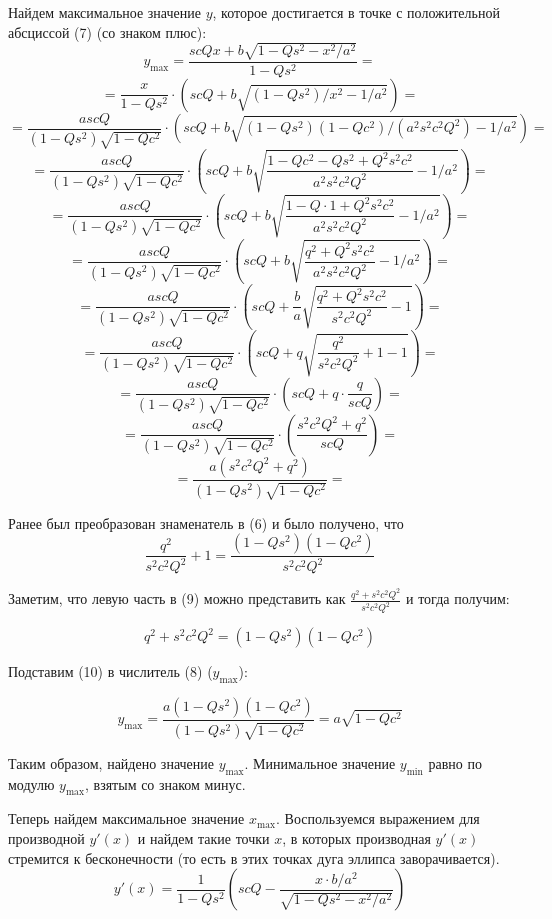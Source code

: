 \documentclass[14pt, a4paper]{article}
\begin{document}
Найдем максимальное значение $y$, которое достигается в точке с положительной абсциссой (7) (со знаком плюс):
$$
	y_{\text{max}} = \frac{scQx + b\sqrt{1-Qs^2-x^2/a^2}}{1-Qs^2} = 
$$
$$
	= \frac{x}{1-Qs^2} \cdot \left(scQ + b\sqrt{(1-Qs^2)/x^2 - 1/a^2}\right) =
$$
$$
	= \frac{ascQ}{(1-Qs^2)\sqrt{1-Qc^2}} \cdot 
	\left(
		scQ + b\sqrt{(1-Qs^2)(1-Qc^2)/(a^2s^2c^2Q^2)- 1/a^2} \right) =	
$$
$$
	= \frac{ascQ}{(1-Qs^2)\sqrt{1-Qc^2}} \cdot 
	\left(
		scQ + b\sqrt{\frac{1-Qc^2-Qs^2+Q^2s^2c^2}{a^2s^2c^2Q^2}- 1/a^2} \right) =	
$$
$$
	= \frac{ascQ}{(1-Qs^2)\sqrt{1-Qc^2}} \cdot 
	\left(
		scQ + b\sqrt{\frac{1-Q\cdot 1 + Q^2s^2c^2}{a^2s^2c^2Q^2}- 1/a^2} \right) =
$$
$$
	= \frac{ascQ}{(1-Qs^2)\sqrt{1-Qc^2}} \cdot 
	\left(
		scQ + b\sqrt{\frac{q^2 + Q^2s^2c^2}{a^2s^2c^2Q^2}- 1/a^2} \right) =
$$
$$
	= \frac{ascQ}{(1-Qs^2)\sqrt{1-Qc^2}} \cdot 
	\left(
		scQ + \frac{b}{a}\sqrt{\frac{q^2 + Q^2s^2c^2}{s^2c^2Q^2}- 1} \right) =
$$
$$
	= \frac{ascQ}{(1-Qs^2)\sqrt{1-Qc^2}} \cdot 
	\left(
		scQ + q\sqrt{\frac{q^2}{s^2c^2Q^2} + 1 - 1} \right) =
$$
$$
	= \frac{ascQ}{(1-Qs^2)\sqrt{1-Qc^2}} \cdot 
	\left(
		scQ + q\cdot \frac{q}{scQ} \right) =
$$
$$
	= \frac{ascQ}{(1-Qs^2)\sqrt{1-Qc^2}} \cdot 
	\left(
		\frac{s^2c^2Q^2 +q^2}{scQ} \right) =
$$
\begin{equation}
	= \frac{a(s^2c^2Q^2 +q^2)}{(1-Qs^2)\sqrt{1-Qc^2}} =
\end{equation}

Ранее был преобразован знаменатель в (6) и было получено, что
\begin{equation}
	\frac{q^2}{s^2c^2Q^2} + 1 = \frac{(1-Qs^2)(1-Qc^2)}{s^2c^2Q^2}
\end{equation}

Заметим, что левую часть в (9) можно представить как $\frac{q^2 + s^2c^2Q^2}{s^2c^2Q^2}$ и тогда получим:

\begin{equation}
	q^2 + s^2c^2Q^2 = (1-Qs^2)(1-Qc^2)
\end{equation}

Подставим (10) в числитель (8) ($y_{\text{max}}$):

\begin{equation}
	y_{\text{max}} = \frac{a(1-Qs^2)(1-Qc^2)}{(1-Qs^2)\sqrt{1-Qc^2}} = a\sqrt{1-Qc^2}
\end{equation}

Таким образом, найдено значение $y_{\text{max}}$. Минимальное значение $y_{\text{min}}$ равно по модулю $y_{\text{max}}$, взятым со знаком минус.

Теперь найдем максимальное значение $x_{\text{max}}$. Воспользуемся выражением для производной $y'(x)$ и найдем такие точки $x$, в которых производная $y'(x)$ стремится к бесконечности (то есть в этих точках дуга эллипса заворачивается).
\begin{equation}
	y'(x) = \frac{1}{1-Qs^2}\left(scQ - \frac{x\cdot b/a^2}{\sqrt{1-Qs^2-x^2/a^2}}\right)
\end{equation}
\end{document}
